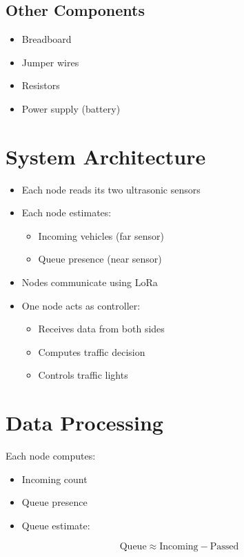 \documentclass[11pt]{article}
\begin{document}
\subsection{Other Components}
\begin{itemize}
    \item Breadboard
    \item Jumper wires
    \item Resistors
    \item Power supply (battery)
\end{itemize}

\section{System Architecture}

\begin{itemize}
    \item Each node reads its two ultrasonic sensors
    \item Each node estimates:
    \begin{itemize}
        \item Incoming vehicles (far sensor)
        \item Queue presence (near sensor)
    \end{itemize}
    \item Nodes communicate using LoRa
    \item One node acts as controller:
    \begin{itemize}
        \item Receives data from both sides
        \item Computes traffic decision
        \item Controls traffic lights
    \end{itemize}
\end{itemize}

\section{Data Processing}

Each node computes:
\begin{itemize}
    \item Incoming count
    \item Queue presence
    \item Queue estimate:
\end{itemize}

\[
\text{Queue} \approx \text{Incoming} - \text{Passed}
\]
\end{document}
